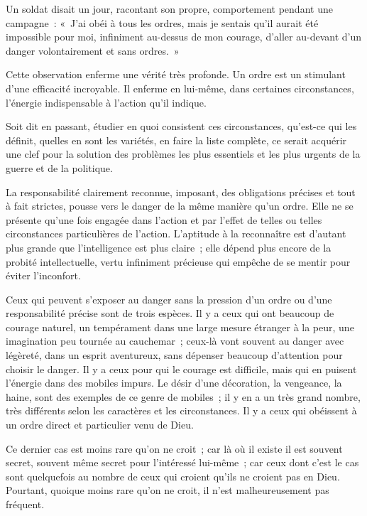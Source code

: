 \documentclass[french,twoside]{book} %
\begin{document}
Un soldat disait un jour, racontant son propre, comportement pendant une campagne : « J'ai obéi à tous les ordres, mais je sentais qu'il aurait été impossible pour moi, infiniment au-dessus de mon courage, d'aller au-devant d'un danger volontairement et sans ordres. »\par
Cette observation enferme une vérité très profonde. Un ordre est un stimulant d'une efficacité incroyable. Il enferme en lui-même, dans certaines circonstances, l'énergie indispensable à l'action qu'il indique.\par
Soit dit en passant, étudier en quoi consistent ces circonstances, qu'est-ce qui les définit, quelles en sont les variétés, en faire la liste complète, ce serait acquérir une clef pour la solution des problèmes les plus essentiels et les plus urgents de la guerre et de la politique.\par
La responsabilité clairement reconnue, imposant, des obligations précises et tout à fait strictes, pousse vers le danger de la même manière qu'un ordre. Elle ne se présente qu'une fois engagée dans l'action et par l'effet de telles ou telles circonstances particulières de l'action. L'aptitude à la reconnaître est d'autant plus grande que l'intelligence est plus claire ; elle dépend plus encore de la probité intellectuelle, vertu infiniment précieuse qui empêche de se mentir pour éviter l'inconfort.\par
Ceux qui peuvent s'exposer au danger sans la pression d'un ordre ou d'une responsabilité précise sont de trois espèces. Il y a ceux qui ont beaucoup de courage naturel, un tempérament dans une large mesure étranger à la peur, une imagination peu tournée au cauchemar ; ceux-là vont souvent au danger avec légèreté, dans un esprit aventureux, sans dépenser beaucoup d'attention pour choisir le danger. Il y a ceux pour qui le courage est difficile, mais qui en puisent l'énergie dans des mobiles impurs. Le désir d'une décoration, la vengeance, la haine, sont des exemples de ce genre de mobiles ; il y en a un très grand nombre, très différents selon les caractères et les circonstances. Il y a ceux qui obéissent à un ordre direct et particulier venu de Dieu.\par
Ce dernier cas est moins rare qu'on ne croit ; car là où il existe il est souvent secret, souvent même secret pour l'intéressé lui-même ; car ceux dont c'est le cas sont quelquefois au nombre de ceux qui croient qu'ils ne croient pas en Dieu. Pourtant, quoique moins rare qu'on ne croit, il n'est malheureusement pas fréquent.\par
\end{document}
